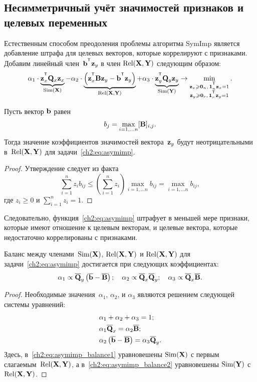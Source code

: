 \subsection{Несимметричный учёт значимостей признаков и целевых переменных}
Естественным способом преодоления проблемы алгоритма SymImp является добавление штрафа для целевых векторов, которые коррелируют с признаками.
Добавим линейный член~$\bb^{\T} \bz_y$ в член $\text{Rel}(\mathbf{X}, \mathbf{Y})$ следующим образом:
\begin{equation}
\alpha_1 \cdot \underbrace{\bz_x^{\T} \bQ_x \bz_x}_{\text{Sim}(\bX)} - \alpha_2 \cdot  \underbrace{\left(\bz_x^{\T} \bB \bz_y - \bb^{\T} \bz_y \right) }_{\text{Rel}(\bX, \bY)} + \alpha_3 \cdot \underbrace{\bz_y^{\T} \bQ_y \bz_y}_{\text{Sim}(\bY)} \rightarrow \min_{\substack{\bz_x \geq \bZero_n, \, \bOne_n^{\T}\bz_x=1 \\ \bz_y \geq \bZero_r, \, \bOne_r^{\T}\bz_y=1}}.
\label{ch2:eq:asymimp}
\end{equation}
\begin{statement}
	Пусть вектор $\mathbf{b}$ равен
	\begin{equation*}
	b_j = \max_{i=1, \dots n} [\mathbf{B}]_{i, j}.
	\end{equation*}
	Тогда значение коэффициентов значимостей вектора~$\mathbf{z}_y$ будут неотрицательными в~$\text{Rel}(\mathbf{X}, \mathbf{Y})$ для задачи~\eqref{ch2:eq:asymimp}.
\end{statement}
\begin{proof}
	Утверждение следует из факта
	\[
	\sum_{i=1}^n  z_i b_{ij} \leq \left(\sum_{i=1}^n z_i \right)\max_{i=1, \dots n} b_{ij} = \max_{i=1, \dots n} b_{ij},
	\]
	где $z_i \geq 0$ и $\sum_{i=1}^n z_i = 1$.
\end{proof}
Следовательно, функция~\eqref{ch2:eq:asymimp} штрафует в меньшей мере признаки, которые имеют отношение к целевым векторам, и целевые вектора, которые недостаточно коррелированы с признаками.
\begin{statement}
	Баланс между членами~$\text{Sim}(\mathbf{X})$, $\text{Rel}(\mathbf{X}, \mathbf{Y})$ и $\text{Rel}(\mathbf{X}, \mathbf{Y})$ для задачи~\eqref{ch2:eq:asymimp} достигается при следующих коэффициентах:
	\begin{equation*}
	\alpha_1 \propto \overline{\mathbf{Q}}_y \left( \overline{\mathbf{b}} - \overline{\mathbf{B}}\right); \quad
	\alpha_2 \propto \overline{\mathbf{Q}}_x \overline{\mathbf{Q}}_y; \quad
	\alpha_3  \propto \overline{\mathbf{Q}}_x \overline{\mathbf{B}}.
	\end{equation*}
\end{statement}
\begin{proof}
	Необходимые значения~$\alpha_1$, $\alpha_2$, и $\alpha_3$ являются решением следующей системы уравнений:
	\begin{align}
	&\alpha_1 + \alpha_2 + \alpha_3 = 1; \\
	&\alpha_1 \overline{\mathbf{Q}}_x = \alpha_2 \overline{\mathbf{B}}; \label{ch2:eq:asymimp_balance1}\\
	&\alpha_2 \left(\overline{\mathbf{b}} - \overline{\mathbf{B}} \right) = \alpha_3 \overline{\mathbf{Q}}_y.
	\label{ch2:eq:asymimp_balance2}
	\end{align}
	Здесь, в~\eqref{ch2:eq:asymimp_balance1} уравновешены $\text{Sim}(\mathbf{X})$ с первым слагаемым~$\text{Rel}(\mathbf{X}, \mathbf{Y})$, а в~\eqref{ch2:eq:asymimp_balance2} уравновешены $\text{Sim}(\mathbf{Y})$  с~$\text{Rel}(\mathbf{X}, \mathbf{Y})$.
\end{proof}

